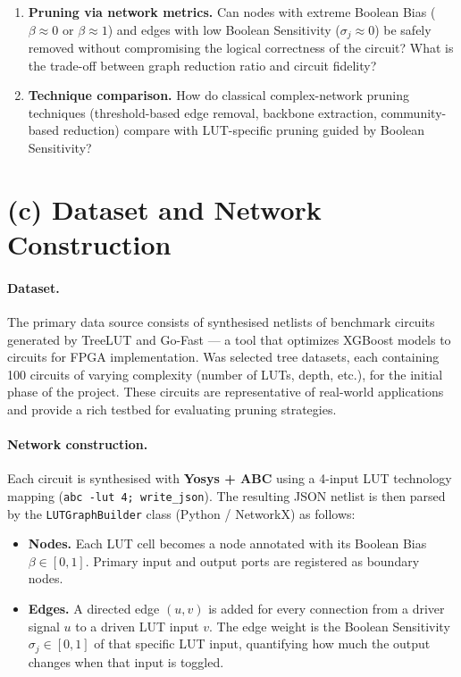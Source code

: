 \documentclass[12pt,a4paper]{article}
\begin{document}
\begin{enumerate}[label=\textbf{RQ\arabic*.}, leftmargin=*, itemsep=4pt]

    \item \textbf{Pruning via network metrics.}
    Can nodes with extreme Boolean Bias ($\beta \approx 0$ or
    $\beta \approx 1$) and edges with low Boolean Sensitivity
    ($\sigma_j \approx 0$) be safely removed without compromising the
    logical correctness of the circuit? What is the trade-off between
    graph reduction ratio and circuit fidelity?

    \item \textbf{Technique comparison.}
    How do classical complex-network pruning techniques (threshold-based
    edge removal, backbone extraction, community-based reduction) compare
    with LUT-specific pruning guided by Boolean Sensitivity?

\end{enumerate}

\section*{(c) Dataset and Network Construction}

\paragraph{Dataset.}
The primary data source consists of synthesised netlists of benchmark circuits generated by TreeLUT \cite{khataei2025treelut} and Go-Fast \cite{barros2025go}--- a tool that optimizes XGBoost models to circuits for FPGA implementation. Was selected tree datasets, each containing 100 circuits of varying complexity (number of LUTs, depth, etc.), for the initial phase of the project. These circuits are representative of real-world applications and provide a rich testbed for evaluating pruning strategies.

\paragraph{Network construction.}
Each circuit is synthesised with \textbf{Yosys + ABC} using a 4-input LUT
technology mapping (\texttt{abc -lut 4; write\_json}). The resulting JSON
netlist is then parsed by the \texttt{LUTGraphBuilder} class (Python /
NetworkX) as follows:

\begin{itemize}[itemsep=2pt]
    \item \textbf{Nodes.} Each LUT cell becomes a node annotated with its
    Boolean Bias $\beta \in [0,1]$. Primary input and output ports are
    registered as boundary nodes.
    \item \textbf{Edges.} A directed edge $(u, v)$ is added for every
    connection from a driver signal $u$ to a driven LUT input $v$. The edge
    weight is the Boolean Sensitivity $\sigma_j \in [0,1]$ of that specific
    LUT input, quantifying how much the output changes when that input is
    toggled.
\end{itemize}




\end{document}
